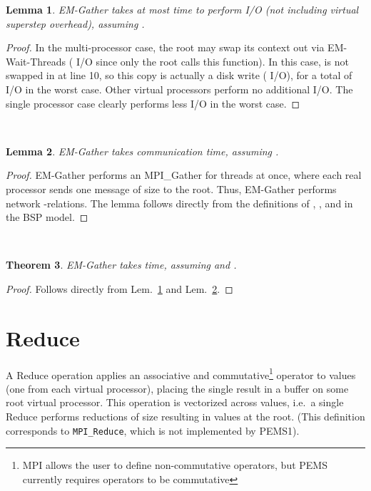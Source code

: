 \documentclass[12pt]{carletoncsthesis}
\newtheorem{thm}{Theorem}[section]
\newtheorem{lemma}[thm]{Lemma}
\begin{document}
\begin{lemma}
\label{em-gather-io}
{\sc EM-Gather} takes at most  time to perform I/O
(not including virtual superstep overhead), assuming .
\end{lemma}
\begin{proof}
In the multi-processor case, the root may swap its context out via {\sc
EM-Wait-Threads} ( I/O since only the root calls this function).
In this case,  is not swapped in at line 10, so this copy is
actually a disk write ( I/O), for a total of  I/O
in the worst case.  Other virtual processors perform no additional I/O.
The single processor case clearly performs less I/O in the worst case.
\end{proof}

 \\

\begin{lemma}
\label{em-gather-comm}
{\sc EM-Gather} takes  communication
time, assuming .
\end{lemma}
\begin{proof}
{\sc EM-Gather} performs an {\sc MPI\_Gather} for  threads at once,
where each real processor sends one message of size  to the root.
Thus, {\sc EM-Gather} performs  network -relations.
The lemma follows directly from the definitions of , , and  in the
BSP model.
\end{proof}

 \\

\begin{thm}
\label{em-gather-time}
{\sc EM-Gather} takes  time, assuming  and .
\end{thm}
\begin{proof}
Follows directly from Lem.~\ref{em-gather-io} and Lem.~\ref{em-gather-comm}.
\end{proof}


\clearpage
\section{Reduce}


A Reduce operation applies an associative and commutative\footnote{MPI
allows the user to define non-commutative operators, but PEMS currently
requires operators to be commutative} operator to  values (one from
each virtual processor), placing the single result in a buffer on some
root virtual processor.  This operation is vectorized across  values,
i.e.\ a single Reduce performs  reductions of size  resulting in 
values at the root.  (This definition corresponds to {\tt MPI\_Reduce},
which is not implemented by PEMS1).
\end{document}
